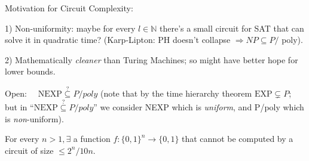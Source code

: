 Motivation for Circuit Complexity:

1) Non-uniformity: maybe for every $l \in \mathbb{N}$ there's a small circuit for SAT that can solve it in quadratic time?
(Karp-Lipton: PH doesn't collapse $\Rightarrow N P \subseteq P /$ poly).

2) Mathematically \textit{cleaner} than Turing Machines; so might have better hope for lower bounds.

Open: $\quad \mathrm{NEXP}\stackrel{?}{\subseteq}P/poly$ (note that by the time hierarchy theorem $\mathrm{EXP}\subsetneq P$; but in ``$\mathrm{NEXP}\stackrel{?}{\subseteq}P/poly$'' we consider NEXP which is \emph{uniform}, and P/poly which is \textit{non}-uniform).


\begin{theorem}
    For every $n>1, \exists$ a function $f:\{0,1\}^n \rightarrow\{0,1\}$ that cannot be computed by a circuit of size  $\le 2^n / 10 n$.
\end{theorem}

